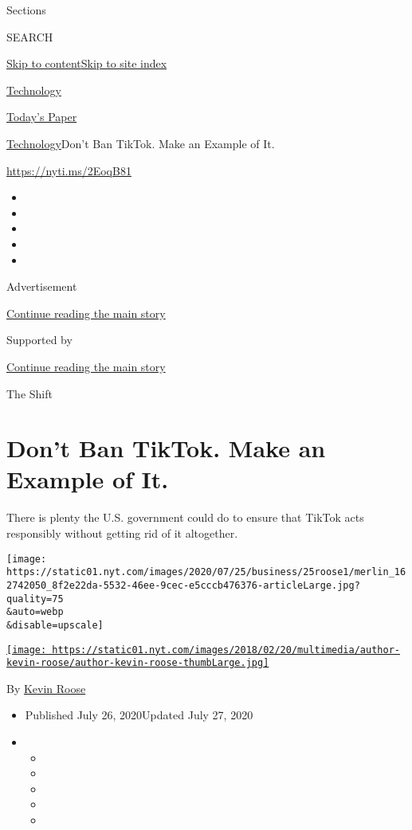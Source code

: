 Sections

SEARCH

\protect\hyperlink{site-content}{Skip to
content}\protect\hyperlink{site-index}{Skip to site index}

\href{https://www.nytimes.com/section/technology}{Technology}

\href{https://myaccount.nytimes.com/auth/login?response_type=cookie\&client_id=vi}{}

\href{https://www.nytimes.com/section/todayspaper}{Today's Paper}

\href{/section/technology}{Technology}\textbar{}Don't Ban TikTok. Make
an Example of It.

\url{https://nyti.ms/2EoqB81}

\begin{itemize}
\item
\item
\item
\item
\item
\end{itemize}

Advertisement

\protect\hyperlink{after-top}{Continue reading the main story}

Supported by

\protect\hyperlink{after-sponsor}{Continue reading the main story}

The Shift

\hypertarget{dont-ban-tiktok-make-an-example-of-it}{%
\section{Don't Ban TikTok. Make an Example of
It.}\label{dont-ban-tiktok-make-an-example-of-it}}

There is plenty the U.S. government could do to ensure that TikTok acts
responsibly without getting rid of it altogether.

\texttt{[image: https://static01.nyt.com/images/2020/07/25/business/25roose1/merlin\_162742050\_8f2e22da-5532-46ee-9cec-e5cccb476376-articleLarge.jpg?quality=75\\\&auto=webp\\\&disable=upscale]}

\href{https://www.nytimes.com/by/kevin-roose}{\texttt{[image: https://static01.nyt.com/images/2018/02/20/multimedia/author-kevin-roose/author-kevin-roose-thumbLarge.jpg]}}

By \href{https://www.nytimes.com/by/kevin-roose}{Kevin Roose}

\begin{itemize}
\item
  Published July 26, 2020Updated July 27, 2020
\item
  \begin{itemize}
  \item
  \item
  \item
  \item
  \item
  \end{itemize}
\end{itemize}

